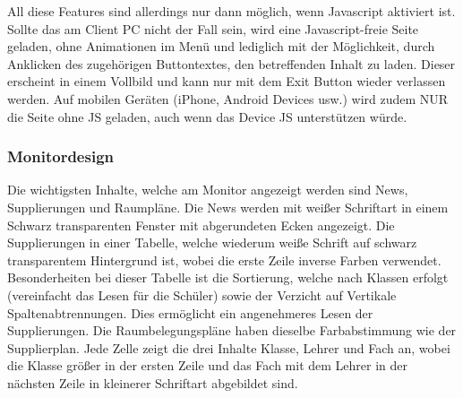 All diese Features sind allerdings nur dann möglich, wenn Javascript aktiviert ist. Sollte das am Client PC nicht der Fall sein, wird eine Javascript-freie Seite geladen, ohne Animationen im Menü und lediglich mit der Möglichkeit, durch Anklicken des zugehörigen Buttontextes, den betreffenden Inhalt zu laden. Dieser erscheint in einem Vollbild und kann nur mit dem Exit Button wieder verlassen werden. Auf mobilen Geräten (iPhone, Android Devices usw.) wird zudem NUR die Seite ohne JS geladen, auch wenn das Device JS unterstützen würde.
\subsubsection{Monitordesign}
Die wichtigsten Inhalte, welche am Monitor angezeigt werden sind News, Supplierungen und Raumpläne. Die News werden mit weißer Schriftart in einem Schwarz transparenten Fenster mit abgerundeten Ecken angezeigt. Die Supplierungen in einer Tabelle, welche wiederum weiße Schrift auf schwarz transparentem Hintergrund ist, wobei die erste Zeile inverse Farben verwendet. Besonderheiten bei dieser Tabelle ist die Sortierung, welche nach Klassen erfolgt (vereinfacht das Lesen für die Schüler) sowie der Verzicht auf Vertikale Spaltenabtrennungen. Dies ermöglicht ein angenehmeres Lesen der Supplierungen. Die Raumbelegungspläne haben dieselbe Farbabstimmung wie der Supplierplan. Jede Zelle zeigt die drei Inhalte Klasse, Lehrer und Fach an, wobei die Klasse größer in der ersten Zeile und das Fach mit dem Lehrer in der nächsten Zeile in kleinerer Schriftart abgebildet sind.